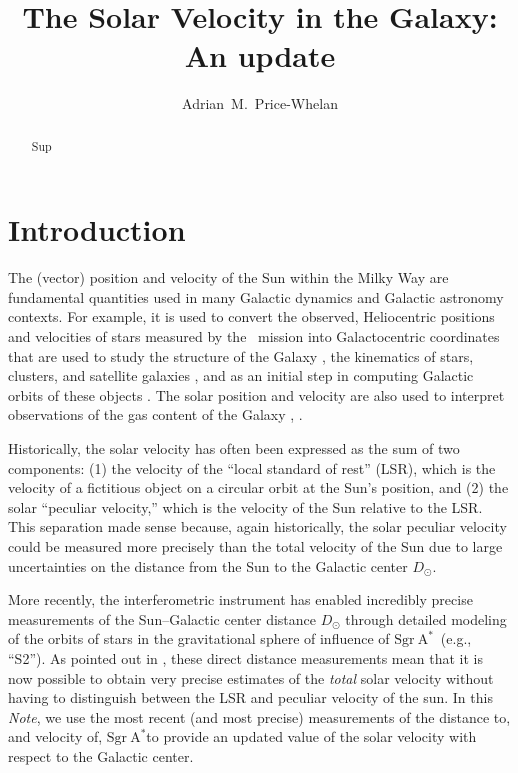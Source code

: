 \documentclass[RNAAS]{aastex631}
\newcommand{\sgrA}{\ensuremath{\textrm{Sgr}~\textrm{A}^{*}}}
\begin{document}
\title{The Solar Velocity in the Galaxy: An update}

\author[0000-0003-0872-7098]{Adrian~M.~Price-Whelan}



\begin{abstract}\noindent
Sup
\end{abstract}

\section{Introduction} \label{sec:intro}

The (vector) position and velocity of the Sun within the Milky Way are
fundamental quantities used in many Galactic dynamics and Galactic astronomy
contexts.
For example, it is used to convert the observed, Heliocentric positions and
velocities of stars measured by the \gaia\ mission into Galactocentric
coordinates that are used to study the structure of the Galaxy
\cite[e.g.,][]{todo}, the kinematics of stars, clusters, and satellite galaxies
\cite[e.g.,][]{todo}, and as an initial step in computing Galactic orbits of
these objects \citep[e.g.,][]{}.
The solar position and velocity are also used to interpret observations of the
gas content of the Galaxy \citep{todo}, .

Historically, the solar velocity has often been expressed as the sum of two
components: (1) the velocity of the ``local standard of rest'' (LSR), which is
the velocity of a fictitious object on a circular orbit at the Sun's position,
and (2) the solar ``peculiar velocity,'' which is the velocity of the Sun
relative to the LSR.
This separation made sense because, again historically, the solar peculiar
velocity could be measured more precisely than the total velocity of the Sun due
to large uncertainties on the distance from the Sun to the Galactic center
$D_\odot$.

More recently, the interferometric  instrument has enabled
incredibly precise measurements of the Sun--Galactic center distance $D_\odot$
through detailed modeling of the orbits of stars in the gravitational sphere of
influence of \sgrA\ (e.g., ``S2'').
As pointed out in \citet{Drimmel:2018}, these direct distance measurements mean
that it is now possible to obtain very precise estimates of the \emph{total}
solar velocity without having to distinguish between the LSR and peculiar
velocity of the sun.
In this \textit{Note}, we use the most recent (and most precise)
 measurements of the distance to, and velocity of, \sgrA to
provide an updated value of the solar velocity with respect to the Galactic
center.
\end{document}
